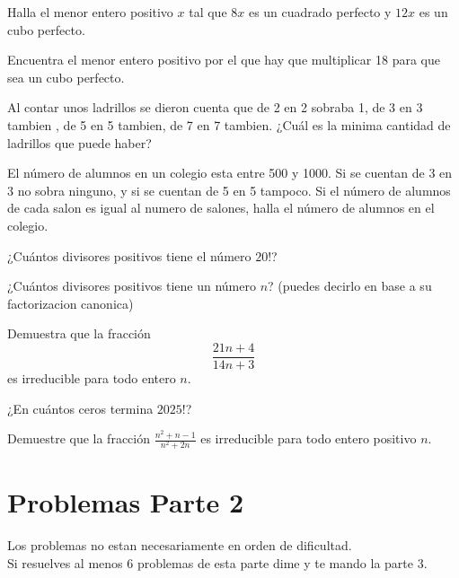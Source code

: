 \documentclass[11pt]{scrartcl}
\begin{document}
\begin{problem}
	Halla el menor entero positivo $x$ tal que $8x$ es un cuadrado perfecto y $12x$ es un cubo perfecto.
\end{problem}
\begin{problem}
Encuentra el menor entero positivo por el que hay que multiplicar 18 para que sea un cubo perfecto. 
\end{problem}
\begin{problem}

	Al contar unos ladrillos se dieron cuenta que de 2 en 2 sobraba 1, de 3 en 3 tambien , de 5 en 5 tambien, de 7 en 7 tambien.  ¿Cuál es la minima cantidad de ladrillos que puede haber?
\end{problem}
\begin{problem} %
	El número de alumnos en un colegio esta entre 500 y 1000. Si se cuentan de 3 en 3 no sobra ninguno, y si se cuentan de 5 en 5 tampoco. Si el número de alumnos de cada salon es igual al numero de salones, halla el número de alumnos en el colegio. 
\end{problem}

\begin{problem}

    ¿Cuántos divisores positivos tiene el número $20!$?
   
\end{problem}
\begin{problem}
	¿Cuántos divisores positivos tiene un número $n$? (puedes decirlo en base a su factorizacion canonica)
\end{problem}

\begin{problem} %
Demuestra que la fracci\'on 
\[\frac{21n+4}{14n+3}\]
es irreducible para todo entero $n$.
\end{problem}
\begin{problem}
¿En cu\'antos ceros termina $2025!$?
\end{problem}



\begin{problem} %

    Demuestre que la fracción $ \frac{n^2+n-1}{n^2+2n}$ es irreducible para todo entero positivo $n$.

\end{problem}


\newpage
\section{Problemas Parte 2}
Los problemas no estan necesariamente en orden de dificultad. \\
Si resuelves al menos 6 problemas de esta parte dime y te mando la parte 3. 
\end{document}
